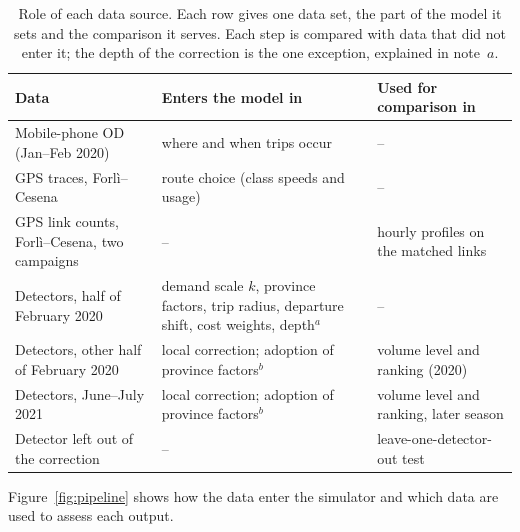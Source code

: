 \documentclass[preprint,11pt,a4paper]{elsarticle}
\begin{document}
\begin{table}[htbp]
\centering
\caption{Role of each data source. Each row gives one data set, the part of the model it sets and the comparison it serves. Each step is compared with data that did not enter it; the depth of the correction is the one exception, explained in note~$a$.}
\label{tab:roles}
\begin{tabular}{@{}p{3.6cm}p{5.4cm}p{6.0cm}@{}}
\toprule
Data & Enters the model in & Used for comparison in \\
\midrule
Mobile-phone OD (Jan--Feb 2020) & where and when trips occur & -- \\
GPS traces, Forl\`i--Cesena & route choice (class speeds and usage) & -- \\
GPS link counts, Forl\`i--Cesena, two campaigns & -- & hourly profiles on the matched links \\
Detectors, half of February 2020 & demand scale $k$, province factors, trip radius, departure shift, cost weights, depth$^{a}$ & -- \\
Detectors, other half of February 2020 & local correction; adoption of province factors$^{b}$ & volume level and ranking (2020) \\
Detectors, June--July 2021 & local correction; adoption of province factors$^{b}$ & volume level and ranking, later season \\
Detector left out of the correction & -- & leave-one-detector-out test \\
\bottomrule
\end{tabular}
\par{}
\end{table}

Figure~\ref{fig:pipeline} shows how the data enter the simulator and which data are used to assess each output.
\end{document}
